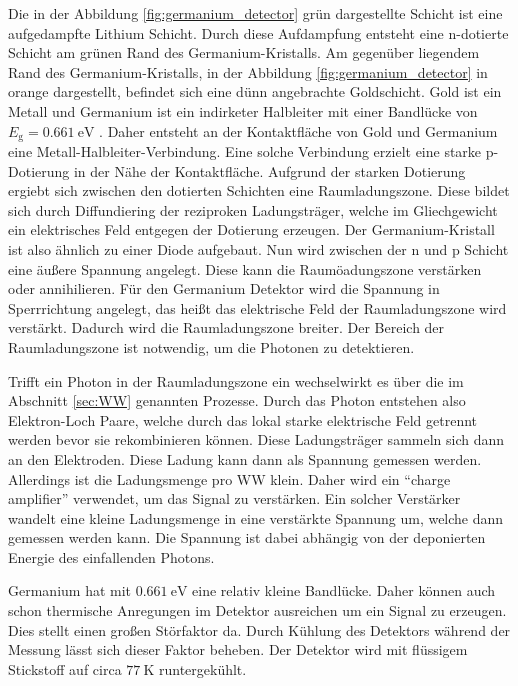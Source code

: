 Die in der Abbildung \ref{fig:germanium_detector} grün 
dargestellte Schicht ist eine aufgedampfte Lithium Schicht. Durch diese Aufdampfung entsteht eine n-dotierte Schicht am grünen Rand des Germanium-Kristalls. 
Am gegenüber liegendem Rand des Germanium-Kristalls, in der Abbildung \ref{fig:germanium_detector} in orange dargestellt, befindet sich eine dünn angebrachte Goldschicht.
Gold ist ein Metall und Germanium ist ein indirketer Halbleiter mit einer Bandlücke von $E_\mathrm{g} = \qty{0.661}{\electronvolt}$ \cite{germanium_gap}. Daher entsteht an der
Kontaktfläche von Gold und Germanium eine Metall-Halbleiter-Verbindung. Eine solche Verbindung erzielt eine starke p-Dotierung in der Nähe der Kontaktfläche. Aufgrund der 
starken Dotierung ergiebt sich zwischen den dotierten Schichten eine Raumladungszone. Diese bildet sich durch Diffundiering der reziproken Ladungsträger, welche im Gliechgewicht
ein elektrisches Feld entgegen der Dotierung erzeugen. Der Germanium-Kristall ist also ähnlich zu einer Diode aufgebaut. Nun wird zwischen der n und p Schicht eine äußere Spannung 
angelegt. Diese kann die Raumöadungszone verstärken oder annihilieren. Für den Germanium Detektor wird die Spannung in Sperrrichtung angelegt, das heißt das elektrische Feld der 
Raumladungszone wird verstärkt. Dadurch wird die Raumladungszone breiter. Der Bereich der Raumladungszone ist notwendig, um die Photonen zu detektieren. 

Trifft ein Photon in der Raumladungszone ein wechselwirkt es über die im Abschnitt \ref{sec:WW} genannten Prozesse. Durch das Photon entstehen also Elektron-Loch Paare, welche durch 
das lokal starke elektrische Feld getrennt werden bevor sie rekombinieren können. Diese Ladungsträger sammeln sich dann an den Elektroden. Diese Ladung kann dann als Spannung 
gemessen werden. Allerdings ist die Ladungsmenge pro WW klein. Daher wird ein \enquote{charge amplifier} verwendet, um das Signal zu verstärken. Ein solcher Verstärker wandelt eine 
kleine Ladungsmenge in eine verstärkte Spannung um, welche dann gemessen werden kann. Die Spannung ist dabei abhängig von der deponierten Energie des einfallenden Photons. 

Germanium hat mit $\qty{0.661}{\electronvolt}$ eine relativ kleine Bandlücke. Daher können auch schon thermische Anregungen im Detektor ausreichen um ein Signal zu erzeugen. 
Dies stellt einen großen Störfaktor da. Durch Kühlung des Detektors während der Messung lässt sich dieser Faktor beheben. Der Detektor wird mit flüssigem Stickstoff auf 
circa $\qty{77}{\kelvin}$ runtergekühlt.

